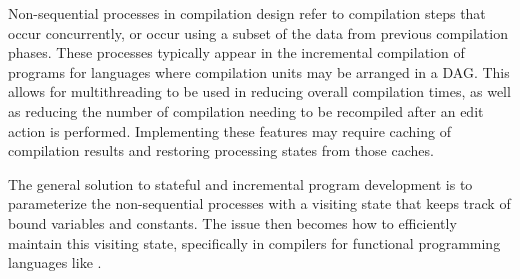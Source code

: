 Non-sequential processes in compilation design refer to compilation steps that occur concurrently, or occur using a subset of the data from previous compilation phases.
These processes typically appear in the incremental compilation of programs for languages where compilation units may be arranged in a \ac{DAG}.
This allows for multithreading to be used in reducing overall compilation times, as well as reducing the number of compilation needing to be recompiled after an edit action is performed.
Implementing these features may require caching of compilation results and restoring processing states from those caches.

The general solution to stateful and incremental program development is to parameterize the non-sequential processes with a visiting state that keeps track of bound variables and constants.
The issue then becomes how to efficiently maintain this visiting state, specifically in compilers for functional programming languages like \Beluga.
